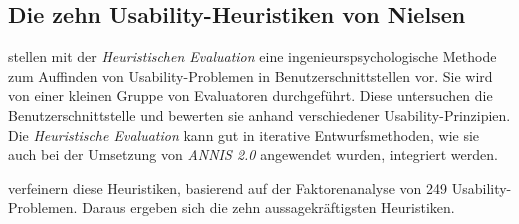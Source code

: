 \subsection{Die zehn Usability-Heuristiken von Nielsen}\label{sec:Heuristiken}

\citet[][]{nielsen-molich90} stellen mit der \emph{Heuristischen Evaluation} eine ingenieurspsychologische Methode zum Auffinden von Usability-Problemen in Benutzerschnittstellen vor. Sie wird von einer kleinen Gruppe von Evaluatoren durchgeführt. Diese untersuchen die Benutzerschnittstelle und bewerten sie anhand verschiedener Usability-Prinzipien. Die \emph{Heuristische Evaluation} kann gut in iterative Entwurfsmethoden, wie sie auch bei der Umsetzung von \emph{ANNIS 2.0} angewendet wurden, integriert werden.

\citet[][]{nielsen94-heuristic-eval} verfeinern diese Heuristiken, basierend auf der Faktorenanalyse von 249 Usability-Problemen. Daraus ergeben sich die zehn aussagekräftigsten Heuristiken.


